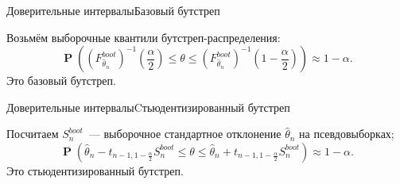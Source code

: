\documentclass[11pt,pdf,utf8,hyperref={unicode},aspectratio=169]{beamer}
\DeclareMathOperator{\prob}{\mathbf{P}}
\begin{document}
\begin{frame}{Доверительные интервалы}{Базовый бутстреп}

Возьмём выборочные квантили бутстреп-распределения:
			$$\prob\left(\left(F_{\hat{\theta}_n}^{boot}\right)^{-1}\left(\frac{\alpha}{2}\right) \leq \theta \leq \left(F_{\hat{\theta}_n}^{boot}\right)^{-1}\left(1-\frac{\alpha}{2}\right) \right)\approx 1-\alpha.$$
			Это базовый бутстреп.
\end{frame}
\begin{frame}{Доверительные интервалы}{Cтьюдентизированный бутстреп}

Посчитаем $S_n^{boot}$~--- выборочное стандартное отклонение $\hat{\theta}_n$ на псевдовыборках;
			$$\prob \left(\hat{\theta}_n - t_{n-1, 1-\frac{\alpha}{2}} S_n^{boot}  \leq \theta \leq \hat{\theta}_n + t_{n-1, 1-\frac{\alpha}{2}} S_n^{boot}\right)\approx 1-\alpha.$$
			Это стьюдентизированный бутстреп.
\end{frame}
\end{document}
